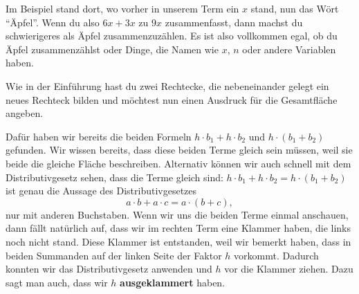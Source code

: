 \documentclass[../../main.tex]{subfiles}
\begin{document}
	Im Beispiel stand dort, wo vorher in unserem Term ein $x$ stand, nun das Wört \enquote{Äpfel}. Wenn du also $6x+3x$ zu $9x$ zusammenfasst, dann machst du schwierigeres als Äpfel zusammenzuzählen. Es ist also vollkommen egal, ob du Äpfel zusammenzählst oder Dinge, die Namen wie $x$, $n$ oder andere Variablen haben.

	
	\begin{example}{}
		Wie in der Einführung hast du zwei Rechtecke, die nebeneinander gelegt
		ein neues Rechteck bilden und möchtest nun einen Ausdruck für die Gesamtfläche angeben.
		\begin{center}
        \end{center}
		Dafür haben wir bereits die beiden Formeln $h\cdot b_1 + h\cdot b_2$ und $h\cdot (b_1+b_2)$ gefunden. Wir wissen bereits, dass diese beiden Terme gleich sein müssen, weil sie beide die gleiche Fläche beschreiben. Alternativ können wir auch schnell mit dem Distributivgesetz sehen, dass die Terme gleich sind:
		$h\cdot b_1+h\cdot b_2=h\cdot (b_1+b_2)$ ist genau die Aussage des Distributivgesetzes 
		\[a\cdot b+a\cdot c=a\cdot (b+c),\] 
		nur mit anderen Buchstaben.
		Wenn wir uns die beiden Terme einmal anschauen, dann fällt natürlich auf, dass wir im rechten Term eine Klammer haben, die links noch nicht stand. Diese Klammer ist entstanden, weil wir bemerkt haben, dass in beiden Summanden auf der linken Seite der Faktor $h$ vorkommt. Dadurch konnten wir das Distributivgesetz anwenden und $h$ vor die Klammer ziehen. Dazu sagt man auch, dass wir $h$ \textbf{ausgeklammert} haben.

\end{example}
\end{document}
